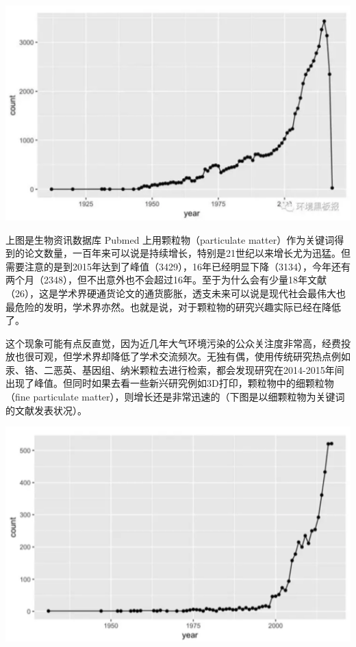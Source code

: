 \documentclass[
]{book}
\begin{document}
\includegraphics[width=6.67in]{images/cw2}

上图是生物资讯数据库 Pubmed 上用颗粒物（particulate matter）作为关键词得到的论文数量，一百年来可以说是持续增长，特别是21世纪以来增长尤为迅猛。但需要注意的是到2015年达到了峰值（3429），16年已经明显下降（3134），今年还有两个月（2348），但不出意外也不会超过16年。至于为什么会有少量18年文献（26），这是学术界硬通货论文的通货膨胀，透支未来可以说是现代社会最伟大也最危险的发明，学术界亦然。也就是说，对于颗粒物的研究兴趣实际已经在降低了。

这个现象可能有点反直觉，因为近几年大气环境污染的公众关注度非常高，经费投放也很可观，但学术界却降低了学术交流频次。无独有偶，使用传统研究热点例如汞、铬、二恶英、基因组、纳米颗粒去进行检索，都会发现研究在2014-2015年间出现了峰值。但同时如果去看一些新兴研究例如3D打印，颗粒物中的细颗粒物（fine particulate matter），则增长还是非常迅速的（下图是以细颗粒物为关键词的文献发表状况）。

\includegraphics[width=6.67in]{images/cw3}
\end{document}
